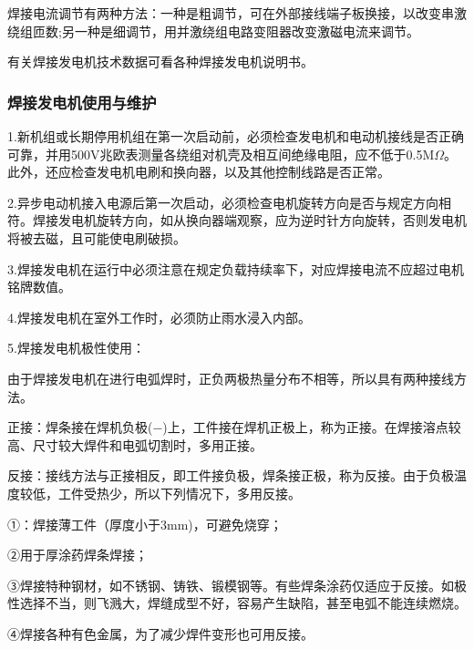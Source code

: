 \documentclass{ctexbook}
\begin{document}
焊接电流调节有两种方法：一种是粗调节，可在外部接线端子板换接，以改变串激绕组匝数;另一种是细调节，用并激绕组电路变阻器改变激磁电流来调节。

有关焊接发电机技术数据可看各种焊接发电机说明书。
\subsubsection{焊接发电机使用与维护}
1.新机组或长期停用机组在第一次启动前，必须检查发电机和电动机接线是否正确可靠，并用500V兆欧表测量各绕组对机壳及相互间绝缘电阻，应不低于0.5M$\Omega$。此外，还应检查发电机电刷和换向器，以及其他控制线路是否正常。

2.异步电动机接入电源后第一次启动，必须检查电机旋转方向是否与规定方向相符。焊接发电机旋转方向，如从换向器端观察，应为逆时针方向旋转，否则发电机将被去磁，且可能使电刷破损。

3.焊接发电机在运行中必须注意在规定负载持续率下，对应焊接电流不应超过电机铭牌数值。

4.焊接发电机在室外工作时，必须防止雨水浸入内部。

5.焊接发电机极性使用：

由于焊接发电机在进行电弧焊时，正负两极热量分布不相等，所以具有两种接线方法。

正接：焊条接在焊机负极($-$)上，工件接在焊机正极上，称为正接。在焊接溶点较高、尺寸较大焊件和电弧切割时，多用正接。

反接：接线方法与正接相反，即工件接负极，焊条接正极，称为反接。由于负极温度较低，工件受热少，所以下列情况下，多用反接。

①：焊接薄工件（厚度小于3mm)，可避免烧穿；

②用于厚涂药焊条焊接；

③焊接特种钢材，如不锈钢、铸铁、锻模钢等。有些焊条涂药仅适应于反接。如极性选择不当，则飞溅大，焊缝成型不好，容易产生缺陷，甚至电弧不能连续燃烧。

④焊接各种有色金属，为了减少焊件变形也可用反接。
\end{document}
